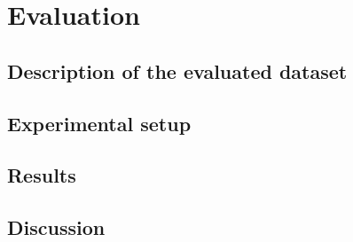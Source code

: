 \chapter{Evaluation}

\label{Chapter4}


\section{Description of the evaluated dataset} %
\label{sec:description_of_the_evaluated_dataset}


\section{Experimental setup} %
\label{sec:experimental_setup}


\section{Results} %
\label{sec:results}


\section{Discussion} %
\label{sec:discussion}

